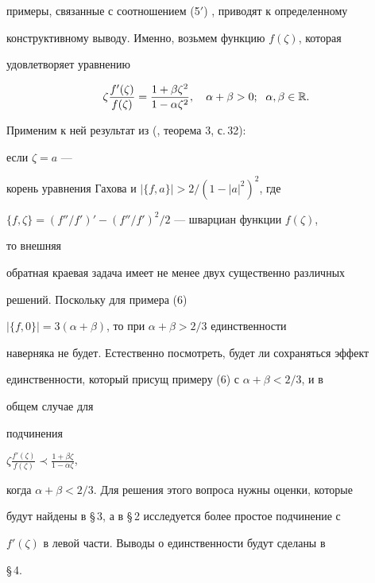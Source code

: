 примеры, связанные с соотношением (5${}'$) , приводят к определенному


конструктивному выводу. Именно, возьмем функцию $f(\zeta)$, которая


удовлетворяет уравнению


\begin{equation}


\zeta\frac{f'(\zeta)}{f(\zeta)}=


\frac{1+\beta\zeta^2}{1-\alpha\zeta^2},\quad


\alpha+\beta>0;\ \; \alpha,\beta\in\Bbb R.


\end{equation}


Применим к ней результат из (\cite{6}, теорема 3, с.\,32):


если $\zeta=a$ ---


корень уравнения Гахова и $|\{f,a\}|>2/(1-|a|^2)^2$, где


$\{f,\zeta\}=(f''/f')'-(f''/f')^2/2$ --- шварциан функции $f(\zeta)$,


то внешняя


обратная краевая задача имеет не менее двух существенно различных


решений. Поскольку для примера (6)\;


$|\{f,0\}|=3(\alpha+\beta)$, то при $\alpha+\beta>2/3$ единственности


наверняка не будет. Естественно посмотреть, будет ли сохраняться эффект


единственности, который присущ примеру (6) с $\alpha+\beta<2/3$, и в


общем случае для


подчинения


$\zeta\frac{f'(\zeta)}{f(\zeta)}\prec\frac{1+\beta\zeta}


{1-\alpha\zeta}$,


когда $\alpha+\beta<2/3$. Для решения этого вопроса нужны оценки, которые


будут найдены в \S\,3, а в \S\,2 исследуется более простое подчинение с


$f'(\zeta)$ в левой части. Выводы о единственности будут сделаны в


\S\,4.





\section{\ }





